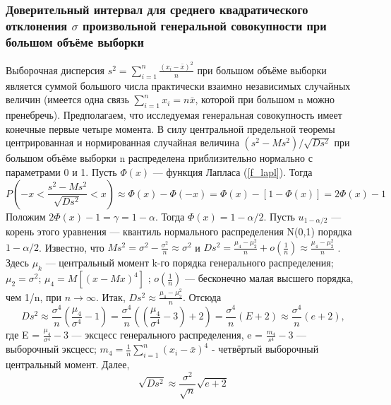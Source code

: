 \subsubsection{Доверительный интервал для среднего квадратического отклонения $\sigma$ произвольной генеральной совокупности при большом объёме выборки}
Выборочная дисперсия $s^{2} = \sum_{i = 1}^{n}{\frac{(x_{i} - \bar{x})^{2}}{n}}$ при большом объёме выборки является суммой большого числа практически взаимно независимых случайных величин (имеется одна связь $\sum_{i=1}^{n}{x_{i}} = n\bar{x}$, которой при большом n можно пренебречь). Предполагаем, что исследуемая генеральная совокупность имеет конечные первые четыре момента.
\newline
В силу центральной предельной теоремы центрированная и нормированная случайная величина $(s^{2}-Ms^{2})/\sqrt{D s^{2}}$ при большом объёме выборки n распределена приблизительно нормально с параметрами 0 и 1. Пусть $\Phi(x)$ — функция Лапласа (\ref{f_lapl}). Тогда
\begin{equation}
	P\left(-x < \frac{s^{2}-Ms^{2}}{\sqrt{D s^{2}}} < x\right)
	\approx \Phi(x) - \Phi(-x)=\Phi(x) - [1 - \Phi(x)] = 2\Phi(x) - 1
	\label{P_as_sigma}
\end{equation}
Положим $2\Phi(x)-1 = \gamma = 1-\alpha$. Тогда $\Phi(x) = 1-\alpha/2$. Пусть $u_{1-\alpha/2}$ — корень этого уравнения — квантиль нормального распределения N(0,1) порядка $1-\alpha/2$. Известно, что $Ms^{2} = \sigma^{2} -\frac{\sigma^{2}}{n} \approx \sigma^{2}$ и $D s^{2} = \frac{\mu_{4} -\mu_{2}^{2}}{n} + o(\frac{1}{n}) \approx \frac{\mu_{4} -\mu_{2}^{2}}{n}$ . Здесь $\mu_{k}$ — центральный момент k-го порядка генерального распределения; $\mu_{2} = \sigma^{2}$; $\mu_{4} = M[(x-M x)^{4}]$ ; $o(\frac{1}{n})$ — бесконечно малая высшего порядка, чем 1/n, при $n\rightarrow \infty$. Итак, $D s^{2} \approx \frac{\mu_{4} -\mu_{2}^{2}}{n}$. Отсюда
\begin{equation}
	D s^{2} \approx \frac{\sigma^{4}}{n}(\frac{\mu_{4}}{\sigma^{4}} - 1) = 
	\frac{\sigma^{4}}{n}((\frac{\mu_{4}}{\sigma^{4}} - 3) + 2) = \frac{\sigma^{4}}{n}(E + 2) \approx \frac{\sigma^{4}}{n}(e + 2),
	\label{Ds_2}
\end{equation}
где E = $\frac{\mu_{4}}{\sigma^{4}} - 3$ — эксцесс генерального распределения, e = $\frac{m_{4}}{s^{4}} - 3$ — выборочный эксцесс; $m_{4} = \frac{1}{n}\sum_{i =1}^{n}{(x_{i} - \bar{x})^{4}}$  - четвёртый выборочный центральный момент. Далее,
\begin{equation}
	\sqrt{D s^{2}} \approx \frac{\sigma^{2}}{\sqrt{n}}\sqrt{e + 2}
	\label{sqrt_Ds}
\end{equation}
